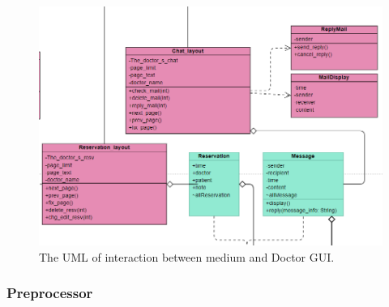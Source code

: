 \documentclass{article}
\begin{document}
\begin{figure}[h]
  \centering
  \includegraphics[scale = 0.35]{asset/frontend_and_medium/MED_usage_doctor_gui.png}
  \caption{The UML of interaction between medium and Doctor GUI.}
  \label{fig:uml_medium_and_doctor_gui}
\end{figure}

\subsubsection*{Preprocessor}
\end{document}
